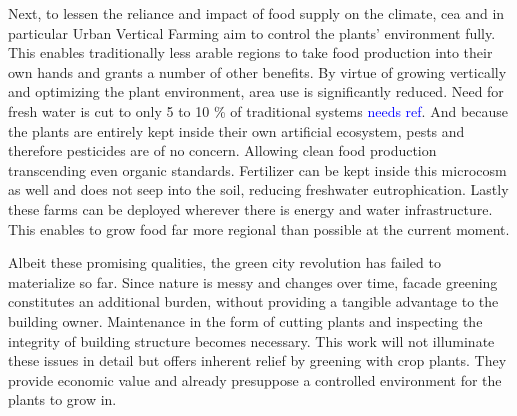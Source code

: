 Next, to lessen the reliance and impact of food supply on the climate, \ac{cea} and in particular Urban Vertical Farming aim to control the plants' environment fully.
This enables traditionally less arable regions to take food production into their own hands and grants a number of other benefits. %
By virtue of growing vertically and optimizing the plant environment, area use is significantly reduced.
Need for fresh water is cut to only 5 to 10 \% of traditional systems \textcolor{Blue}{needs ref}. %
And because the plants are entirely kept inside their own artificial ecosystem, pests and therefore pesticides are of no concern.
Allowing clean food production transcending even organic standards.
Fertilizer can be kept inside this microcosm as well and does not seep into the soil, reducing freshwater eutrophication.
Lastly these farms can be deployed wherever there is energy and water infrastructure.
This enables to grow food far more regional than possible at the current moment.

Albeit these promising qualities, the green city revolution has failed to materialize so far.
Since nature is messy and changes over time, facade greening constitutes an additional burden, without providing a tangible advantage to the building owner.
Maintenance in the form of cutting plants and inspecting the integrity of building structure becomes necessary.
This work will not illuminate these issues in detail but offers inherent relief by greening with crop plants.
They provide economic value and already presuppose a controlled environment for the plants to grow in.

